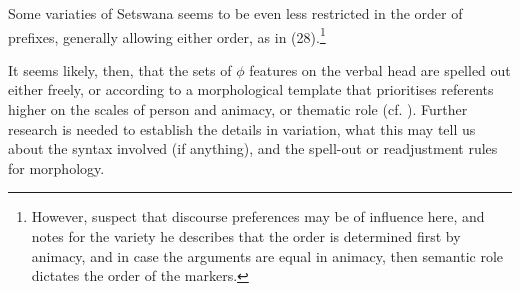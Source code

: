\documentclass[output=paper
,modfonts
,nonflat]{langsci/langscibook}
\begin{document}
Some variaties of Setswana seems to be even less restricted in the order of prefixes, generally allowing either order, as in (28).\footnote{However, \citet{Pretorius_et_al2012} suspect that discourse preferences may be of influence here, and \citet{Creissels2002} notes for the variety he describes that the order is determined first by animacy, and in case the arguments are equal in animacy, then semantic role dictates the order of the markers.} 

It seems likely, then, that the sets of $\phi$ features on the verbal head are spelled out either freely, or according to a morphological template that prioritises referents higher on the scales of person and animacy, or thematic role (cf. \citealt{Duranti1979}). Further research is needed to establish the details in variation, what this may tell us about the syntax involved (if anything), and the spell-out or readjustment rules for morphology.
\end{document}
